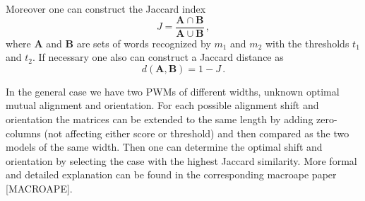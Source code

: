 Moreover one can construct the Jaccard index 
$$J = \frac{\mathbf{A}\cap \mathbf{B}}{\mathbf{A}\cup \mathbf{B}}\,, $$
where $\mathbf{A}$ and $\mathbf{B}$ are 
sets of words recognized by $m_1$ and $m_2$ with the thresholds $t_1$ and $t_2$. If necessary one also can 
construct a Jaccard distance as $$d(\mathbf{A},\mathbf{B}) = 1 - J\,.$$

In the general case we have two PWMs of different widths, unknown optimal mutual 
alignment and orientation. For each possible alignment shift and orientation the matrices can be 
extended to the same length by adding zero-columns (not affecting either score or threshold) 
and then compared as the two models of the same width. Then one can determine the optimal 
shift and orientation by selecting the case with the highest Jaccard similarity. More formal and 
detailed explanation can be found in the corresponding macroape paper [MACROAPE].
